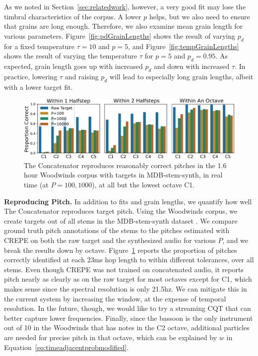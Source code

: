 \documentclass{article}
\begin{document}
As we noted in Section~\ref{sec:relatedwork}, however, a very good fit may lose the timbral characteristics of the corpus.  A lower $p$ helps, but we also need to ensure that grains are long enough.  Therefore, we also examine mean grain length for various parameters.  Figure~\ref{fig:pdGrainLengths} shows the result of varying $p_d$ for a fixed temperature $\tau=10$ and $p=5$, and Figure~\ref{fig:tempGrainLengths} shows the result of varying the temperature $\tau$ for $p=5$ and $p_d = 0.95$.  As expected, grain length goes up with increased $p_d$ and down with increased $\tau$.  In practice, lowering $\tau$ and raising $p_d$ will lead to especially long grain lengths, albeit with a lower target fit.

\begin{figure}
    \centering
    \includegraphics[width=\columnwidth]{figs/PitchTests.pdf}
    \caption{The Concatenator reproduces reasonably correct pitches in the 1.6 hour Woodwinds corpus with targets in MDB-stem-synth, in real time (at $P=100, 1000$), at all but the lowest octave C1.}
    \label{fig:PitchTests}
\end{figure}

\textbf{Reproducing Pitch.} In addition to fits and grain lengths, we quantify how well The Concatenator reproduces target pitch.  Using the Woodwinds corpus, we create targets out of all stems in the MDB-stem-synth dataset \cite{salamon2017analysis}.  We compare ground truth pitch annotations of the stems to the pitches estimated with CREPE \cite{kim2018crepe} on both the raw target and the synthesized audio for various $P$, and we break the results down by octave.  Figure~\ref{fig:PitchTests} reports the proportion of pitches correctly identified at each 23ms hop length to within different tolerances, over all stems.  Even though CREPE was not trained on concatenated audio, it reports pitch nearly as clearly as on the raw target for most octaves except for C1, which makes sense since the spectral resolution is only 21.5hz.  We can mitigate this in the current system by increasing the window, at the expense of temporal resolution.  In the future, though, we would like to try a streaming CQT that can better capture lower frequencies.  Finally, since the bassoon is the only instrument out of 10 in the Woodwinds that has notes in the C2 octave, additional particles are needed for precise pitch in that octave, which can be explained by $w$ in Equation~\ref{eq:timeadjacentprobmodified}.
\end{document}
